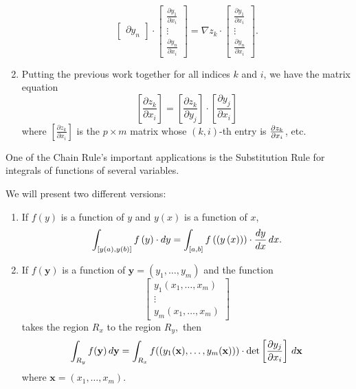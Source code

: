 \documentclass{ximera}
\begin{document}
\begin{theorem}
\begin{enumerate}
\[\begin{bmatrix}
{    \partial y_{n}}%
  \end{bmatrix}
  \cdot
  \begin{bmatrix}
    \frac{\partial y_{1}}{\partial x_{i}} \\ 
    \vdots \\ 
    \frac{\partial y_{n}}{\partial x_{i}}%
  \end{bmatrix}
  =\nabla z_{k}\cdot
  \begin{bmatrix}
    \frac{\partial y_{1}}{\partial x_{i}} \\ 
    \vdots \\ 
    \frac{\partial y_{n}}{\partial x_{i}}%
  \end{bmatrix}. 
  \]
  
\item Putting the previous work together for all indices $k$ and $i$,
  we have the matrix equation%
  \[
  \left[ \frac{\partial z_{k}}{\partial x_{i}}\right] =\left[ \frac{\partial
      z_{k}}{\partial y_{j}}\right] \cdot\left[ \frac{\partial y_{j}}{\partial
      x_{i}}\right]   \label{ChR}
  \]
  where $\left[ \frac{\partial z_{k}}{\partial x_{i}}\right] $ is the $p\times
  m$ matrix whose $(k,i)$-th entry is $\frac{\partial z_{k}}{%
    \partial x_{i}}$, etc.
  \end{enumerate}
\end{theorem}

One of the Chain Rule's important applications is the Substitution Rule
for integrals of functions of several variables.

\begin{theorem} We will present two different versions:
  \begin{enumerate}
  \item If $f\left( y\right) $ is a function of $y$
    and $y\left( x\right) $ is a function of $x$,%
    \[
    \int \nolimits_{\left[ y\left( a\right) ,y\left( b\right) \right] }f\left(
    y\right) \cdot dy=\int \nolimits_{\left[ a,b\right] }f\left( \left( y\left(
    x\right) \right) \right) \cdot\frac{dy}{dx} \,d x. 
    \]
    
  \item If $f(\mathbf{y}) $ is a function of $\mathbf{y} = \left(
    y_{1},\ldots ,y_{m}\right) $ and the function
    \[
    \begin{bmatrix}
      y_{1}(x_{1},\ldots ,x_{m}) \\
      \vdots\\
      y_{m}( x_{1},\ldots,x_{m})
    \end{bmatrix}
    \]
    takes the region $R_{x}$ to the region $R_{y},$ then%
    \[
    \int_{R_{y}}f(\mathbf{y})  \,d \mathbf{y}
    =\int_{R_{x}}f(( y_{1}(\mathbf{x}) ,\ldots ,y_{m}(\mathbf{x}) )
    ) \cdot \det\left[\frac{\partial y_{j}}{\partial x_{i}}\right]
    \,d \mathbf{x}
      \]
      where $\mathbf{x} = (x_{1},\ldots,x_{m})$.
  \end{enumerate}
\end{theorem}
\end{document}
